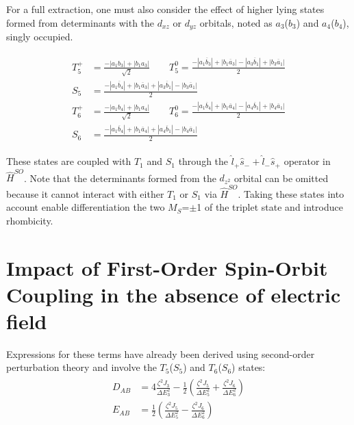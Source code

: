 \documentclass[12pt]{report}
\numberwithin{equation}{section}
\begin{document}
For a full extraction, one must also consider the effect of higher lying states formed from determinants with the $d_{xz}$ or $d_{yz}$ orbitals, noted as $a_3$($b_3$) and $a_4$($b_4$), singly occupied. 

\begin{align}\label{T5T6}
    \begin{split}
        T_5^+&=\frac{-|a_1b_3|+|b_1a_3|}{\sqrt{2}} \qquad T_5^0=\frac{-|a_1\overline{b}_3|+|b_1\overline{a}_3|-|a_3\overline{b}_1|+|b_3\overline{a}_1|}{2}\\
        S_5&=\frac{-|a_1\overline{b}_4|+|b_1\overline{a}_3|+|a_3\overline{b}_1|-|b_3\overline{a}_1|}{2}\\
        T_6^+&=\frac{-|a_1b_4|+|b_1a_4|}{\sqrt{2}} \qquad T_6^0=\frac{-|a_1\overline{b}_4|+|b_1\overline{a}_4|-|a_4\overline{b}_1|+|b_4\overline{a}_1|}{2}\\
        S_6&=\frac{-|a_1\overline{b}_4|+|b_1\overline{a}_4|+|a_4\overline{b}_1|-|b_4\overline{a}_1|}{2}
    \end{split}
\end{align}

These states are coupled with $T_1$ and $S_1$ through the $\hat{l}_+ \hat{s}_- + \hat{l}_-\hat{s}_+$ operator in $\hat{H}^{SO}$.
Note that the determinants formed from the $d_{z^2}$ orbital can be omitted because it cannot interact with either $T_1$ or $S_1$ via $\hat{H}^{SO}$.
Taking these states into account enable differentiation the two $M_S$=$\pm$1 of the triplet state and introduce rhombicity.

\section{Impact of First-Order Spin-Orbit Coupling in the absence of electric field}\label{sec:NoField}

Expressions for these terms have already been derived using second-order perturbation theory and involve the $T_5$($S_5$) and $T_6$($S_6$) states:
\begin{align}\label{eq:PertCu2Cl5}
    \begin{split}
        D_{AB}&=4\frac{\zeta^2 J_3}{\Delta E^2_3}-\frac{1}{2}(\frac{\zeta^2 J_5}{\Delta E^2_5}+\frac{\zeta^2 J_6}{\Delta E^2_6})\\
        E_{AB}&=\frac{1}{2}(\frac{\zeta^2 J_5}{\Delta E^2_5}-\frac{\zeta^2 J_6}{\Delta E^2_6})
    \end{split}
\end{align}
\end{document}

